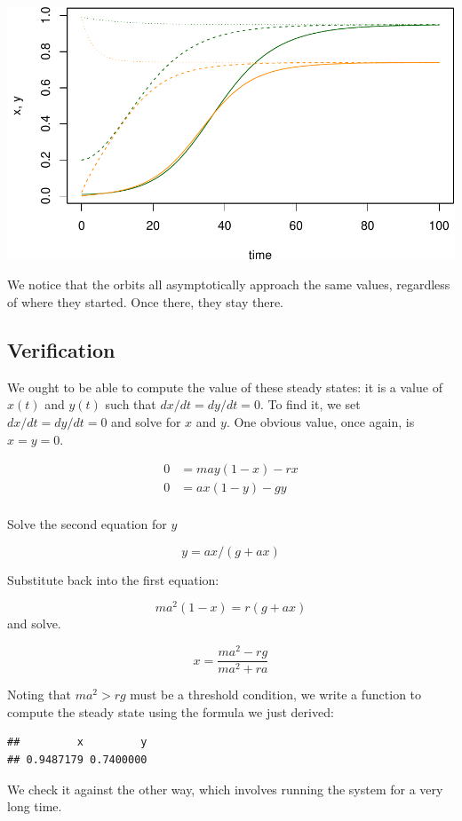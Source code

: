 \documentclass[
]{book}
\begin{document}
\includegraphics{docs/figs/unnamed-chunk-41-1.pdf}

We notice that the orbits all asymptotically approach the same values, regardless of where they started. Once there, they stay there.

\subsection{Verification}\label{verification-1}

We ought to be able to compute the value of these steady states: it is a value of \(x(t)\) and \(y(t)\) such that \(dx/dt=dy/dt=0.\) To find it, we set \(dx/dt=dy/dt=0\) and solve for \(x\) and \(y.\) One obvious value, once again, is \(x=y=0.\)

\[ 
\begin{array}{rl}
0 &= may(1-x) - r x\\
0 &= ax(1-y) - g y \\
\end{array}
\]

Solve the second equation for \(y\)

\[y = ax/(g+ax)\]

Substitute back into the first equation:

\[ma^2 (1-x) = r(g+ax)\]
and solve.

\[x = \frac{\textstyle{m a^2 - rg}}{\textstyle{m a^2 + ra}}\]

Noting that \(m a^2 > rg\) must be a threshold condition, we write a function to compute the steady state using the formula we just derived:

\begin{verbatim}
##         x         y 
## 0.9487179 0.7400000
\end{verbatim}

We check it against the other way, which involves running the system for a very long time.
\end{document}
